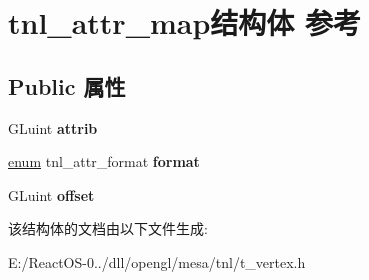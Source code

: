 \hypertarget{structtnl__attr__map}{}\section{tnl\+\_\+attr\+\_\+map结构体 参考}
\label{structtnl__attr__map}
\subsection*{Public 属性}
\begin{DoxyCompactItemize}
\item 
\mbox{\label{structtnl__attr__map_af025c4556700a28c86b6aa4f535615fe}} 
G\+Luint {\bfseries attrib}
\item 
\mbox{\label{structtnl__attr__map_aadba7a39ad21f27ac412e56cc517d34d}} 
\hyperlink{interfaceenum}{enum} tnl\+\_\+attr\+\_\+format {\bfseries format}
\item 
\mbox{\label{structtnl__attr__map_ab5e78d23b76f55d97f09e31db89e860b}} 
G\+Luint {\bfseries offset}
\end{DoxyCompactItemize}


该结构体的文档由以下文件生成\+:\begin{DoxyCompactItemize}
\item 
E\+:/\+React\+O\+S-\/0../dll/opengl/mesa/tnl/t\+\_\+vertex.\+h\end{DoxyCompactItemize}
